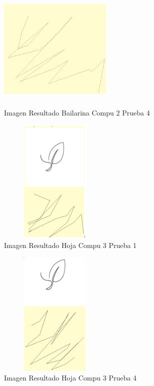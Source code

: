 \documentclass[conference]{IEEEtran}
\begin{document}
\begin{figure}[h]
    \centering
    \includegraphics[width=0.480\textwidth, height=6cm]{cuatroBailCompu2.png} 
    \caption{Imagen Resultado Bailarina Compu 2 Prueba 4}
    \label{fig:mi_imagen}
\end{figure}

\begin{figure}[h]
    \centering
    \includegraphics[width=0.480\textwidth, height=6cm]{hoja-1-compu3.png} 
    \caption{Imagen Resultado Hoja Compu 3 Prueba 1}
    \label{fig:mi_ima{Imagen Resultado Hoja Compu 1 Prueba 1}gen}
\end{figure}

\begin{figure}[h]
    \centering
    \includegraphics[width=0.480\textwidth, height=6cm]{hoja-4-compu3.png} 
    \caption{Imagen Resultado Hoja Compu 3 Prueba 4}
    \label{fig:mi_imagen}
\end{figure}
\end{document}
